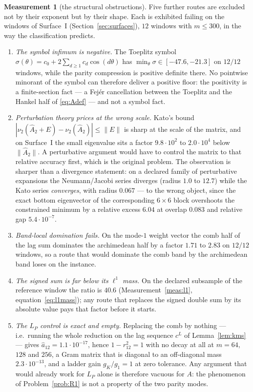 \documentclass[11pt,a4paper]{article}
\theoremstyle{plain}
\theoremstyle{definition}
\newtheorem{measurement}[theorem]{Measurement}
\newcommand{\Ah}{\widehat{A}}
\newcommand{\ah}{\widehat{a}}
\begin{document}
\begin{measurement}[the structural obstructions]
\label{meas:nogo}
Five further routes are excluded not by their exponent but by their shape. Each
is exhibited failing on the windows of Surface~I
(Section~\ref{sec:surfaces}), $12$ windows with $m\le300$, in the way the
classification predicts.
\begin{enumerate}[label=\textup{(N\arabic*)},leftmargin=3.2em]
\item\label{NG:symbol} \emph{The symbol infimum is negative.} The Toeplitz
  symbol $\sigma(\theta)=c_0+2\sum_{d\ge1}c_d\cos(d\theta)$ has
  $\min_\theta\sigma\in[-47.6,-21.3]$ on $12/12$ windows, while the parity
  compression is positive definite there. No pointwise minorant of the symbol
  can therefore deliver a positive floor: the positivity is a finite-section
  fact --- a Fej\'er cancellation \cite{Fejer1916} between the Toeplitz and the
  Hankel half of \eqref{eq:Adef} --- and not a symbol fact.
\item\label{NG:kato} \emph{Perturbation theory prices at the wrong scale.}
  Kato's bound $|\nu_2(\Ah_2+E)-\nu_2(\Ah_2)|\le\lVert E\rVert$ \cite{Kato1949}
  is sharp at the scale of the matrix, and on Surface~I the small eigenvalue
  sits a factor $9.8\cdot10^{2}$ to $2.0\cdot10^{4}$ below
  $\lVert\Ah_2\rVert$. A perturbative argument would have to control the matrix
  to that relative accuracy first, which is the original problem. The
  observation is sharper than a divergence statement: on a declared family of
  perturbative expansions the Neumann/Jacobi series diverges (radius $1.0$ to
  $12.7$) while the Kato series \emph{converges}, with radius $0.067$ --- to the
  wrong object, since the exact bottom eigenvector of the corresponding
  $6\times6$ block overshoots the constrained minimum by a relative excess
  $6.04$ at overlap $0.083$ and relative gap $5.4\cdot10^{-7}$.
\item\label{NG:band} \emph{Band-local domination fails.} On the mode-$1$ weight
  vector the comb half of the lag sum dominates the archimedean half by a
  factor $1.71$ to $2.83$ on $12/12$ windows, so a route that would dominate the
  comb band by the archimedean band loses on the instance.
\item\label{NG:l1} \emph{The signed sum is far below its $\ell^{1}$ mass.} On
  the declared subsample of the reference window the ratio is $40.6$
  (Measurement~\ref{meas:l1}, equation~\eqref{eq:l1mass}); any route that
  replaces the signed double sum by its absolute value pays that factor before
  it starts.
\item\label{NG:LP} \emph{The $L_P$ control is exact and empty.} Replacing the
  comb by nothing --- i.e.\ running the whole reduction on the lag sequence
  $c^{L}$ of Lemma~\ref{lem:kms} --- gives $\ah_{12}=1.1\cdot10^{-17}$, hence
  $1-r_{12}^{2}=1$ with no decay at all at $m=64$, $128$ and $256$, a Gram
  matrix that is diagonal to an off-diagonal mass $2.3\cdot10^{-13}$, and a
  ladder gain $g_K/g_1=1$ at zero tolerance. Any argument
  that would already work for $L_P$ alone is therefore vacuous for $A$: the
  phenomenon of Problem~\ref{prob:R1} is not a property of the two parity modes.
\end{enumerate}
\end{measurement}
\end{document}
